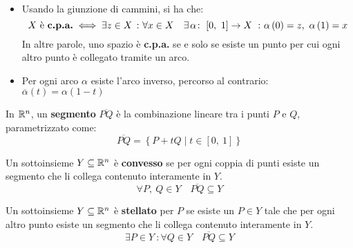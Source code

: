 \begin{observe}~{}\label{giunzionecpa}
	\begin{itemize}
		\item Usando la giunzione di cammini, si ha che:
		\begin{equation*}
			X\text{ è \textbf{c.p.a.}}\iff \exists z\in X\ \colon \forall x\in X\quad
			\exists \funz{\alpha}{\left[0,\ 1\right]}{X}\ \colon \alpha\left(0\right)=z,\ \alpha\left(1\right)=x
		\end{equation*}
		In altre parole, uno spazio è \textbf{c.p.a.} se e solo se esiste un punto per cui ogni altro punto è collegato tramite un arco.
		\item Per ogni arco $\alpha$ esiste l'arco inverso, percorso al contrario: $\overline{\alpha}\left(t\right)=\alpha\left(1-t\right)$
	\end{itemize}
\end{observe}
\begin{define}
	In $\mathbb{R}^n$, un \textbf{segmento} $\overline{PQ}$ è la combinazione lineare tra i punti $P$ e $Q$, parametrizzato come:
	\begin{equation}
		\overline{PQ}=\left\{P+tQ\mid t\in\left[0,\ 1\right]\right\}
	\end{equation}
\end{define}
\begin{define}
	Un sottoinsieme $Y\subseteq\mathbb{R}^n$ è \textbf{convesso} se per ogni coppia di punti esiste un segmento che li collega contenuto interamente in $Y$.
	\begin{equation}
		\forall P,\ Q\in Y\quad \overline{PQ}\subseteq Y
	\end{equation}
\end{define}
\begin{define}
	Un sottoinsieme $Y\subseteq\mathbb{R}^n$ è \textbf{stellato} per $P$ se esiste un $P\in Y$ tale che per ogni altro punto esiste un segmento che li collega contenuto interamente in $Y$.
	\begin{equation}
		\exists P \in Y\ \colon \forall Q\in Y\quad \overline{PQ}\subseteq Y
	\end{equation}
\end{define}
